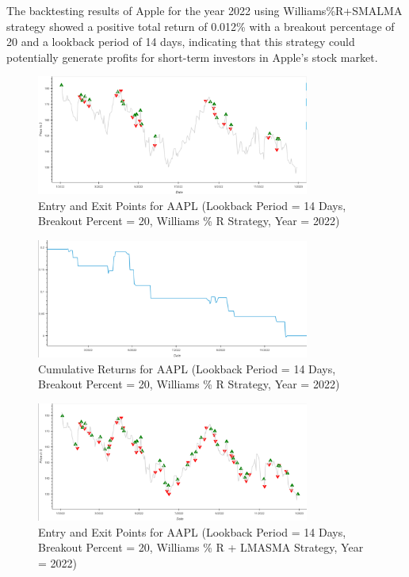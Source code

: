 The backtesting results of Apple for the year 2022 using Williams\%R+SMALMA strategy showed a positive total return of 0.012\% with a breakout percentage of 20 and a lookback period of 14 days, indicating that this strategy could potentially generate profits for short-term investors in Apple's stock market.

\begin{figure}[h!]
\centering
\includegraphics[width=0.8\textwidth]{Images/apple_williams_R_1.png}
\caption{Entry and Exit Points for AAPL (Lookback Period = 14 Days, Breakout Percent = 20, Williams \% R Strategy, Year = 2022)}
\label{fig:entryexit1}
\end{figure}

\begin{figure}[h!]
\centering
\includegraphics[width=0.8\textwidth]{Images/apple_williams_R_2.png}
\caption{Cumulative Returns for AAPL (Lookback Period = 14 Days, Breakout Percent = 20, Williams \% R Strategy, Year = 2022)}
\label{fig:entryexit1}
\end{figure}

\begin{figure}[h!]
\centering
\includegraphics[width=0.8\textwidth]{Images/apple_williams_lma__1.png}
\caption{Entry and Exit Points for AAPL (Lookback Period = 14 Days, Breakout Percent = 20, Williams \% R + LMASMA Strategy, Year = 2022)}
\label{fig:entryexit1}
\end{figure}

